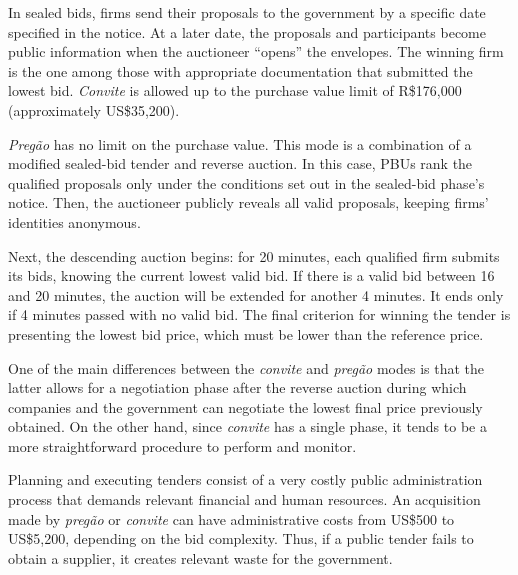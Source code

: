 In sealed bids, firms send their proposals to the government by a specific date specified in the notice. At a later date, the proposals and participants become public information when the auctioneer “opens” the envelopes. The winning firm is the one among those with appropriate documentation that submitted the lowest bid. \textit{Convite} is allowed up to the purchase value limit of R\$176,000 (approximately US\$35,200).

\textit{Pregão} has no limit on the purchase value. This mode is a combination of a modified sealed-bid tender and reverse auction. In this case, PBUs rank the qualified proposals only under the conditions set out in the sealed-bid phase’s notice. Then, the auctioneer publicly reveals all valid proposals, keeping firms’ identities anonymous.

Next, the descending auction begins: for 20 minutes, each qualified firm submits its bids, knowing the current lowest valid bid. If there is a valid bid between 16 and 20 minutes, the auction will be extended for another 4 minutes. It ends only if 4 minutes passed with no valid bid. The final criterion for winning the tender is presenting the lowest bid price, which must be lower than the reference price.

One of the main differences between the \textit{convite} and \textit{pregão} modes is that the latter allows for a negotiation phase after the reverse auction during which companies and the government can negotiate the lowest final price previously obtained. On the other hand, since \textit{convite} has a single phase, it tends to be a more straightforward procedure to perform and monitor.

Planning and executing tenders consist of a very costly public administration process that demands relevant financial and human resources. An acquisition made by \textit{pregão} or \textit{convite} can have administrative costs from US\$500 to US\$5,200, depending on the bid complexity. Thus, if a public tender fails to obtain a supplier, it creates relevant waste for the government.


